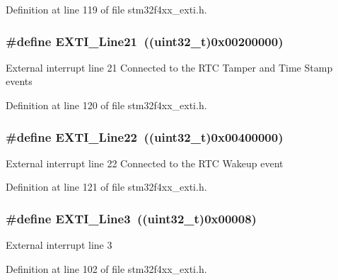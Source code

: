 Definition at line 119 of file stm32f4xx\-\_\-exti.\-h.

\hypertarget{group___e_x_t_i___lines_ga273edacd18e521e5a702c642c5b824af}{
\subsubsection[{E\-X\-T\-I\-\_\-\-Line21}]{\setlength{\rightskip}{0pt plus 5cm}\#define E\-X\-T\-I\-\_\-\-Line21~((uint32\-\_\-t)0x00200000)}}\label{group___e_x_t_i___lines_ga273edacd18e521e5a702c642c5b824af}
External interrupt line 21 Connected to the R\-T\-C Tamper and Time Stamp events 

Definition at line 120 of file stm32f4xx\-\_\-exti.\-h.

\hypertarget{group___e_x_t_i___lines_gabc65f8a90a3d5595896505ef2c59bec6}{
\subsubsection[{E\-X\-T\-I\-\_\-\-Line22}]{\setlength{\rightskip}{0pt plus 5cm}\#define E\-X\-T\-I\-\_\-\-Line22~((uint32\-\_\-t)0x00400000)}}\label{group___e_x_t_i___lines_gabc65f8a90a3d5595896505ef2c59bec6}
External interrupt line 22 Connected to the R\-T\-C Wakeup event 

Definition at line 121 of file stm32f4xx\-\_\-exti.\-h.

\hypertarget{group___e_x_t_i___lines_gadea3ef6ab7e8bacc686689de8711b98c}{
\subsubsection[{E\-X\-T\-I\-\_\-\-Line3}]{\setlength{\rightskip}{0pt plus 5cm}\#define E\-X\-T\-I\-\_\-\-Line3~((uint32\-\_\-t)0x00008)}}\label{group___e_x_t_i___lines_gadea3ef6ab7e8bacc686689de8711b98c}
External interrupt line 3 

Definition at line 102 of file stm32f4xx\-\_\-exti.\-h.

